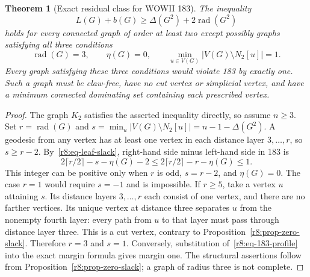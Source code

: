 \documentclass[11pt,a4paper]{article}
\newtheorem{theorem}{Theorem}[section]
\theoremstyle{remark}
\begin{document}
\begin{theorem}[Exact residual class for WOWII 183]
\label{r8:thm-183-residual}
The inequality
\[
 L(G)+b(G)\ge\Delta(G^2)+2\operatorname{rad}(G^2)
\]
holds for every connected graph of order at least two except possibly
graphs satisfying all three conditions
\begin{equation}\label{r8:eq-183-profile}
 \operatorname{rad}(G)=3,\qquad
 \eta(G)=0,\qquad
 \min_{u\in V(G)}|V(G)\setminus N_2[u]|=1.
\end{equation}
Every graph satisfying these three conditions would violate 183 by
exactly one.  Such a graph must be claw-free, have no cut vertex or
simplicial vertex, and have a minimum connected dominating set
containing each prescribed vertex.
\end{theorem}
\begin{proof}
The graph $K_2$ satisfies the asserted inequality directly, so assume
$n\ge3$.  Set $r=\operatorname{rad}(G)$ and
$s=\min_u|V(G)\setminus N_2[u]|=n-1-\Delta(G^2)$.  A geodesic from
any vertex has at least one vertex in each distance layer
$3,\ldots,r$, so $s\ge r-2$.  By~\eqref{r8:eq-leaf-slack}, right-hand
side minus left-hand side in 183 is
\[
 2\lceil r/2\rceil-s-\eta(G)-2
 \le 2\lceil r/2\rceil-r-\eta(G)\le1.
\]
This integer can be positive only when $r$ is odd, $s=r-2$, and
$\eta(G)=0$.  The case $r=1$ would require $s=-1$ and is impossible.
If $r\ge5$, take a vertex $u$ attaining $s$.  Its distance layers
$3,\ldots,r$ each consist of one vertex, and there are no farther
vertices.  Its unique vertex at distance three separates $u$ from
the nonempty fourth layer: every path from $u$ to that layer must
pass through distance layer three.  This is a cut vertex, contrary
to Proposition~\ref{r8:prop-zero-slack}.  Therefore $r=3$ and $s=1$.
Conversely, substitution of~\eqref{r8:eq-183-profile} into the exact
margin formula gives margin one.  The structural assertions follow
from Proposition~\ref{r8:prop-zero-slack}; a graph of radius three
is not complete.
\end{proof}
\end{document}
